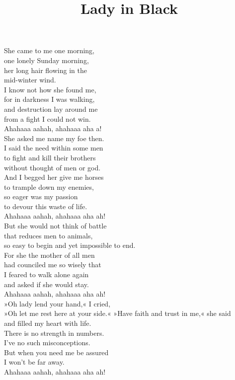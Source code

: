 \title{Lady in Black} 

She  came to me one morning, \\ 
one lonely Sunday morning, \\ 
her  long hair flowing in the \\ 
 mid-winter wind. \\ 
I  know not how she found me, \\ 
for in darkness I was walking, \\ 
and  destruction lay around me \\ 
from a  fight I could not win. \\ 
 Ahahaaa  aahah,  ahahaaa  aha  a! \\ 

She  asked me name my foe then. \\ 
I said the need within some men \\ 
to  fight and kill their brothers \\ 
without  thought of men or god. \\ 
And I  begged her give me horses \\ 
to trample down my enemies, \\ 
so  eager was my passion \\ 
to  devour this waste of life. \\ 
 Ahahaaa  aahah,  ahahaaa  aha  ah! \\ 

But  she would not think of battle \\ 
that reduces men to animals, \\ 
so  easy to begin and yet  impossible to end. \\ 
For  she the mother of all men \\ 
had counciled me so wisely that \\ 
I  feared to walk alone again \\ 
and  asked if she would stay. \\ 
 Ahahaaa  aahah,  ahahaaa  aha  ah! \\ 

»Oh  lady lend your hand,« I cried, \\ 
»Oh let me rest here at your side.«
»Have  faith and trust in me,« she said \\ 
and  filled my heart with life. \\ 
There is no strength in numbers. \\ 
I’ve no such misconceptions. \\ 
But  when you need me be assured \\ 
I  won’t be far away. \\ 
 Ahahaaa  aahah,  ahahaaa  aha  ah! \\
